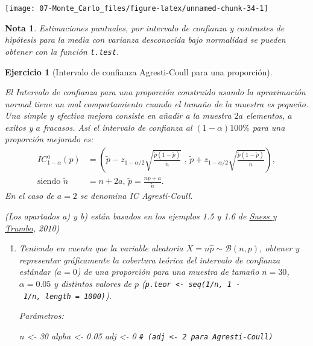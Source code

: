 \documentclass[
]{book}
\newenvironment{Shaded}{\begin{snugshade}}{\end{snugshade}}
\newcommand{\CommentTok}[1]{\textcolor[rgb]{0.56,0.35,0.01}{\textit{#1}}}
\newcommand{\DecValTok}[1]{\textcolor[rgb]{0.00,0.00,0.81}{#1}}
\newcommand{\FloatTok}[1]{\textcolor[rgb]{0.00,0.00,0.81}{#1}}
\newcommand{\NormalTok}[1]{#1}
\newcommand{\OtherTok}[1]{\textcolor[rgb]{0.56,0.35,0.01}{#1}}
\theoremstyle{break}
\newtheorem{exercise}{Ejercicio}[chapter]
\theoremstyle{nonumberplain}
\newtheorem{remark}{Nota}
\renewcommand{\CommentTok}[1]{\textcolor[rgb]{0.41,0.41,0.41}{\texttt{#1}}}
\begin{document}
\begin{center}\texttt{[image: 07-Monte\_Carlo\_files/figure-latex/unnamed-chunk-34-1]} \end{center}

\begin{remark}
Estimaciones puntuales, por intervalo de confianza y contrastes de hipótesis
para la media con varianza desconocida bajo normalidad
se pueden obtener con la función \texttt{t.test}.
\end{remark}

\vspace{0.5cm}

\begin{exercise}[Intervalo de confianza Agresti-Coull para una proporción]
\protect\hypertarget{exr:ic-agresti-coull}{}\label{exr:ic-agresti-coull}

El Intervalo de confianza para una proporción construido usando la
aproximación normal tiene un mal comportamiento cuando el tamaño de
la muestra es pequeño. Una simple y efectiva mejora consiste en
añadir a la muestra \(2a\) elementos, \(a\) exitos y \(a\) fracasos. Así
el intervalo de confianza al \(\left( 1-\alpha\right) 100\%\) para
una proporción mejorado es:
\[\begin{aligned}
IC_{1-\alpha}^{a}\left(  p\right)   
& =\left(  \tilde{p}-z_{1-\alpha/2}\sqrt{\frac{\tilde{p}(1-\tilde{p})}{\tilde{n}}} \text{ , }
\tilde{p}+z_{1-\alpha/2}\sqrt{\frac{\tilde{p}(1-\tilde{p})}{\tilde{n}}}\right)  ,\\
\text{siendo }\tilde{n} & = n+2a \text{, } \tilde{p} = \frac{np+a}{\tilde{n}}.
\end{aligned}\]
En el caso de \(a=2\) se denomina IC Agresti-Coull.

(Los apartados a) y b) están basados en los ejemplos 1.5 y 1.6 de \href{http://www.springer.com/gp/book/9780387402734}{Suess y Trumbo}, 2010)

\begin{enumerate}
\def\labelenumi{\alph{enumi})}
\item
  Teniendo en cuenta que la variable aleatoria \(X=n\hat{p}\sim\mathcal{B}(n,p)\),
  obtener y representar gráficamente la cobertura teórica del
  intervalo de confianza estándar (\(a=0\)) de una proporción para
  una muestra de tamaño \(n=30\), \(\alpha=0.05\) y distintos valores
  de \(p\) (\texttt{p.teor\ \textless{}-\ seq(1/n,\ 1\ -\ 1/n,\ length\ =\ 1000)}).

  Parámetros:

\begin{Shaded}
\begin{Highlighting}[]
\NormalTok{n }\OtherTok{\textless{}{-}} \DecValTok{30}
\NormalTok{alpha }\OtherTok{\textless{}{-}} \FloatTok{0.05}
\NormalTok{adj }\OtherTok{\textless{}{-}} \DecValTok{0}  \CommentTok{\# (adj \textless{}{-} 2 para Agresti{-}Coull)}
\end{Highlighting}
\end{Shaded}


\end{enumerate}
\end{exercise}
\end{document}
